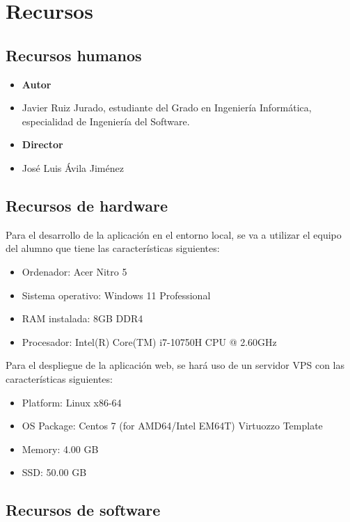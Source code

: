 \chapter{Recursos}\label{cap:recursos}

\section{Recursos humanos}
\begin{itemize}
    \item \textbf{Autor}
    \item[] Javier Ruiz Jurado, estudiante del Grado en Ingeniería Informática, especialidad de Ingeniería del Software.
    \item \textbf{Director}
    \item[] José Luis Ávila Jiménez
\end{itemize}

\section{Recursos de hardware}

Para el desarrollo de la aplicación en el entorno local, se va a utilizar el equipo del alumno que tiene las características siguientes:
\begin{itemize}
    \item Ordenador: Acer Nitro 5
    \item Sistema operativo: Windows 11 Professional
    \item RAM instalada: 8GB DDR4
    \item Procesador: Intel(R) Core(TM) i7-10750H CPU @ 2.60GHz 
\end{itemize}

Para el despliegue de la aplicación web, se hará uso de un servidor VPS con las características siguientes:
\begin{itemize}
    \item Platform: Linux x86-64
    \item OS Package: Centos 7 (for AMD64/Intel EM64T) Virtuozzo Template
    \item Memory: 4.00 GB
    \item SSD: 50.00 GB
\end{itemize}


\section{Recursos de software}


